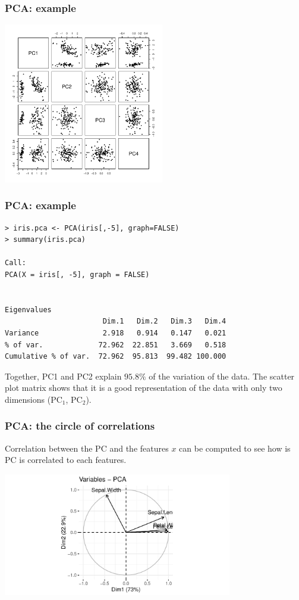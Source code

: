 \begin{frame}
\frametitle{PCA: example}
\begin{center}
\includegraphics[width=7cm]{../../Graphs/Iris_pca.png}
\end{center}
\end{frame}
\begin{frame}[fragile]
\frametitle{PCA: example}
\scriptsize
\begin{verbatim}
> iris.pca <- PCA(iris[,-5], graph=FALSE) 
> summary(iris.pca)

Call:
PCA(X = iris[, -5], graph = FALSE) 


Eigenvalues
                       Dim.1   Dim.2   Dim.3   Dim.4
Variance               2.918   0.914   0.147   0.021
% of var.             72.962  22.851   3.669   0.518
Cumulative % of var.  72.962  95.813  99.482 100.000
\end{verbatim}
\normalsize
Together, PC1 and PC2 explain $95.8\%$ of the variation of the data. The scatter plot matrix shows that it is a good representation of the data with only two dimensions (PC$_1$, PC$_2$).
\end{frame}
\begin{frame}
\frametitle{PCA: the circle of correlations}
Correlation between the PC and the features $x$ can be computed to see how is PC is correlated to each features.
\begin{center}
\includegraphics[width=10cm]{../../Graphs/Iris_pcacircle.png}
\end{center}
\end{frame}
